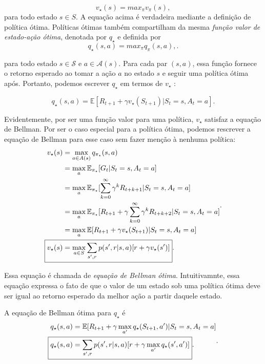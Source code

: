 \documentclass{article}
\begin{document}
\[
  v_{\star}(s)=max_{\pi}v_{\pi}(s),
\] 
para todo estado $s \in S$. A equação acima é verdadeira mediante a definição de política ótima. Políticas ótimas também compartilham da mesma \textit{função valor de estado-ação ótima}, denotada por $q_{\star}$ e definida por
\[
  q_{\star}(s,a)=max_{\pi}q_{\pi}(s,a),

.\] 

para todo estado $s \in \mathcal{S}$ e $a \in \mathcal{A}(s)$. Para cada par $(s,a)$, essa função fornece o retorno esperado ao tomar a ação $a$ no estado $s$ e seguir uma política ótima após. Portanto, podemos escrever $q_{\star}$ em termos de $v_{\star}$ :

\[
  q_{\star}(s,a)=\mathbb{E}[R_{t+1}+\gamma v_{\star}(S_{t+1})| S_t = s, A_t = a]
.\] 


Evidentemente, por ser uma função valor para uma política, $v_{\star}$ satisfaz a equação de Bellman. Por ser o caso especial para a política ótima, podemos rescrever a equação de Bellman para esse caso sem fazer menção à nenhuma política:
\[
\begin{align*}
  v_{\star}(s) &= \max_{a \in A(s)}q_{\pi_{\star}}(s,a)\\
               &= \max_{a}\mathbb{E}_{\pi_{\star}}[G_t|S_t=s, A_t=a]\\
               &= \max_{a}\mathbb{E}_{\pi_{\star}}[\sum_{k=0}^{\infty}{\gamma}^kR_{t+k+1}|S_t=s, A_t=a]\\
               &= \max_{a}\mathbb{E}_{\pi_{\star}}[R_{t+1}+\gamma\sum_{k=0}^{\infty}{\gamma}^kR_{t+k+2}|S_t=s, A_t=a]\\
               &= \max_{a}\mathbb{E}[R_{t+1}+\gamma v_{\star}(S_{t+1})|S_t=s, A_t=a]\\
  \Aboxed{v_{\star}(s) &= \max_{a \in S}\sum_{s',r} p(s',r|s,a)[r+\gamma v_{\star}(s')]}
.\end{align*}
.\] 

Essa equação é chamada de \textit{equação de Bellman ótima}. Intuitivamnte, essa equação expressa o fato de que o valor de um estado sob uma política ótima deve ser igual ao retorno esperado da melhor ação a partir daquele estado.

A equação de Bellman ótima para $q_{\star}$ é
\[
  \begin{align*}
    q_{\star}(s,a) &= \mathbb{E}[R_{t+1} + \gamma \max_{a'} q_{\star}(S_{t+1},a') | S_t = s, A_t = a] \\
    \Aboxed{q_{\star}(s,a) &=\sum_{s',r} p(s',r|s,a)[r+\gamma \max_{a'}q_{\star}(s',a')]}
  .\end{align*}
.\] 
\end{document}
